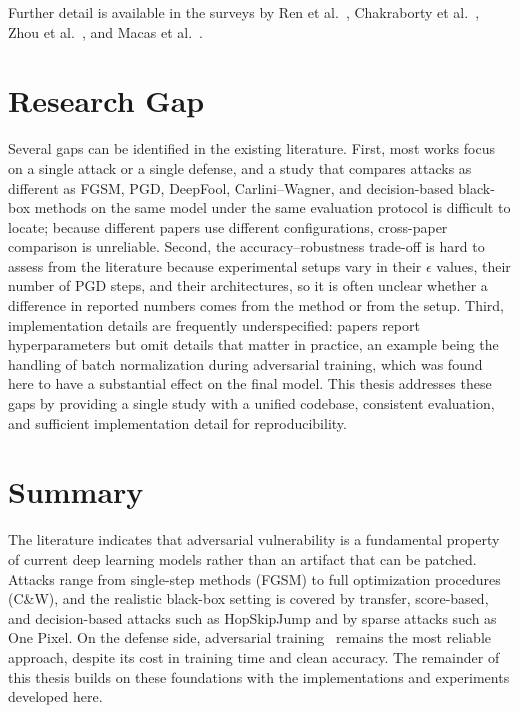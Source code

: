 Further detail is available in the surveys by Ren et al.~\cite{ren2020adversarial}, Chakraborty et al.~\cite{chakraborty2018survey}, Zhou et al.~\cite{zhou2022adversarial}, and Macas et al.~\cite{macas2024adversarial}.

\section{Research Gap}

Several gaps can be identified in the existing literature. First, most works focus on a single attack or a single defense, and a study that compares attacks as different as FGSM, PGD, DeepFool, Carlini--Wagner, and decision-based black-box methods on the same model under the same evaluation protocol is difficult to locate; because different papers use different configurations, cross-paper comparison is unreliable. Second, the accuracy--robustness trade-off is hard to assess from the literature because experimental setups vary in their $\epsilon$ values, their number of PGD steps, and their architectures, so it is often unclear whether a difference in reported numbers comes from the method or from the setup. Third, implementation details are frequently underspecified: papers report hyperparameters but omit details that matter in practice, an example being the handling of batch normalization during adversarial training, which was found here to have a substantial effect on the final model. This thesis addresses these gaps by providing a single study with a unified codebase, consistent evaluation, and sufficient implementation detail for reproducibility.

\section{Summary}

The literature indicates that adversarial vulnerability is a fundamental property of current deep learning models rather than an artifact that can be patched. Attacks range from single-step methods (FGSM) to full optimization procedures (C\&W), and the realistic black-box setting is covered by transfer, score-based, and decision-based attacks such as HopSkipJump and by sparse attacks such as One Pixel. On the defense side, adversarial training~\cite{madry2018towards} remains the most reliable approach, despite its cost in training time and clean accuracy. The remainder of this thesis builds on these foundations with the implementations and experiments developed here.

